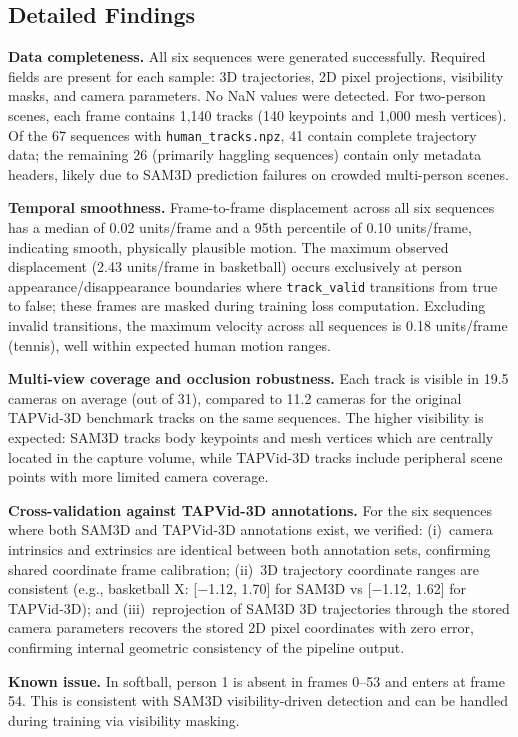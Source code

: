 \documentclass[12pt, a4paper, oneside]{report}
\begin{document}
\subsection{Detailed Findings}
\textbf{Data completeness.} All six sequences were generated successfully. Required fields are present for each sample: 3D trajectories, 2D pixel projections, visibility masks, and camera parameters. No NaN values were detected. For two-person scenes, each frame contains 1,140 tracks (140 keypoints and 1,000 mesh vertices). Of the 67 sequences with \texttt{human\_tracks.npz}, 41 contain complete trajectory data; the remaining 26 (primarily haggling sequences) contain only metadata headers, likely due to SAM3D prediction failures on crowded multi-person scenes.

\textbf{Temporal smoothness.} Frame-to-frame displacement across all six sequences has a median of 0.02 units/frame and a 95th percentile of 0.10 units/frame, indicating smooth, physically plausible motion. The maximum observed displacement (2.43 units/frame in basketball) occurs exclusively at person appearance/disappearance boundaries where \texttt{track\_valid} transitions from true to false; these frames are masked during training loss computation. Excluding invalid transitions, the maximum velocity across all sequences is 0.18 units/frame (tennis), well within expected human motion ranges.

\textbf{Multi-view coverage and occlusion robustness.} Each track is visible in 19.5 cameras on average (out of 31), compared to 11.2 cameras for the original TAPVid-3D benchmark tracks on the same sequences. The higher visibility is expected: SAM3D tracks body keypoints and mesh vertices which are centrally located in the capture volume, while TAPVid-3D tracks include peripheral scene points with more limited camera coverage.

\textbf{Cross-validation against TAPVid-3D annotations.} For the six sequences where both SAM3D and TAPVid-3D annotations exist, we verified: (i)~camera intrinsics and extrinsics are identical between both annotation sets, confirming shared coordinate frame calibration; (ii)~3D trajectory coordinate ranges are consistent (e.g., basketball X: [$-$1.12, 1.70] for SAM3D vs [$-$1.12, 1.62] for TAPVid-3D); and (iii)~reprojection of SAM3D 3D trajectories through the stored camera parameters recovers the stored 2D pixel coordinates with zero error, confirming internal geometric consistency of the pipeline output.

\textbf{Known issue.} In softball, person 1 is absent in frames 0--53 and enters at frame 54. This is consistent with SAM3D visibility-driven detection and can be handled during training via visibility masking.
\end{document}
